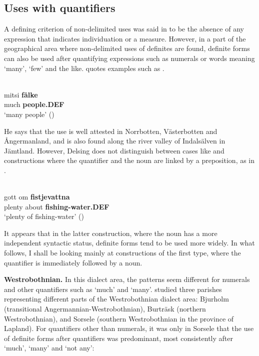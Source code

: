 \subsection{ Uses with quantifiers}
\label{bkm:Ref114303795}

A defining criterion of non-delimited uses was said in  to be the absence of any expression that indicates individuation or a measure. However, in a part of the geographical area where non-delimited uses of definites are found, definite forms can also be used after quantifying expressions such as numerals or words meaning ‘many’, ‘few’ and the like. \citet{Delsing2003a} quotes examples such as .

\ea \label{} 
\\
\gll mitsi  \textbf{fålke}\\
much  \textbf{people.DEF}\\
\glt ‘many people’ (\citet[17]{Delsing2003a})

\z

He says that the use is well attested in Norrbotten, Västerbotten and Ångermanland, and is also found along the river valley of Indalsälven in Jämtland. However, Delsing does not distinguish between cases like  and constructions where the quantifier and the noun are linked by a preposition, as in .

\ea \label{} 
\\
\gll gott  om  \textbf{fistjevattna} \\
plenty  about  \textbf{fishing-water.DEF} \\
\glt ‘plenty of fishing-water’ (\citet[18]{Delsing2003a})

\z

It appears that in the latter construction, where the noun has a more independent syntactic status, definite forms tend to be used more widely. In what follows, I shall be looking mainly at constructions of the first type, where the quantifier is immediately followed by a noun. 

\textbf{Westrobothnian.} In this dialect area, the patterns seem different for numerals and other quantifiers such as ‘much’ and ‘many’. \citet{BergholmEtAl1999} studied three parishes representing different parts of the Westrobothnian dialect area: Bjurholm (transitional Angermannian-Westrobothnian), Burträsk (northern Westrobothnian), and Sorsele (southern Westrobothnian in the province of Lapland). For quantifiers other than numerals, it was only in Sorsele that the use of definite forms after quantifiers was predominant, most consistently after ‘much’, ‘many’ and ‘not any’:

